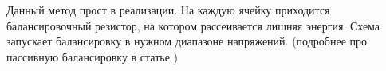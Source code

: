 Данный метод прост в реализации. На каждую ячейку приходится балансировочный резистор, 
на котором рассеивается лишняя энергия.
Схема запускает балансировку в нужном диапазоне напряжений.
(подробнее про пассивную балансировку в статье \cite{8898267})

